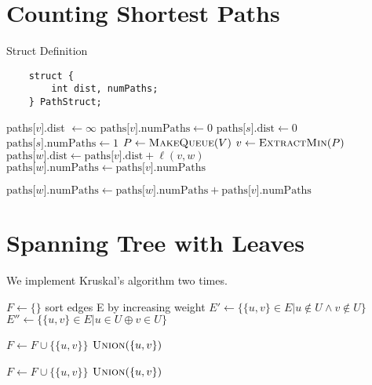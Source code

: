 \documentclass{article}
\begin{document}
\newpage
\section{Counting Shortest Paths}

Struct Definition
\begin{lstlisting}
    struct {
        int dist, numPaths;
    } PathStruct;
\end{lstlisting}

\begin{algorithmic}
            \State paths[$v$].dist $\gets \infty$
            \State $\text{paths[\(v\)].numPaths} \gets 0$
        \EndFor
        \State $\text{paths[\(s\)].dist} \gets 0$
        \State $\text{paths[\(s\)].numPaths} \gets 1$
        \State $P \gets \Call{MakeQueue}{V}$  
            \State $v \gets \Call{ExtractMin}{P}$
                    \State $\text{paths[\(w\)].dist} \gets \text{paths[\(v\)].dist} + \ell(v, w)$
                    \State $\text{paths[\(w\)].numPaths} \gets  \text{paths[\(v\)].numPaths}$

                    \State $\text{paths[\(w\)].numPaths} \gets \text{paths[\(w\)].numPaths} + \text{paths[\(v\)].numPaths}$
                \EndIf
            \EndFor
        \EndWhile

    \EndFunction
\end{algorithmic}

\newpage
\section{Spanning Tree with Leaves}
We implement Kruskal's algorithm two times.

\begin{algorithmic}
            \State {}
        \EndFor

        \State $F \gets \text{\{ \}}$
        \State sort edges E by increasing weight
        \State $E' \gets \{\{u, v\} \in E | u \notin U \land v \notin U\}$ 
        \State $E'' \gets \{\{u, v\} \in E | u \in U \oplus v \in U\}$

                \State $F \gets F \cup \{\{u, v\}\}$
                \State $\Call{Union}{\{u, v\}}$
            \EndIf
        \EndFor

                \State $F \gets F \cup \{\{u, v\}\}$
                \State $\Call{Union}{\{u, v\}}$
            \EndIf
        \EndFor

    \EndFunction
\end{algorithmic}
\end{document}

